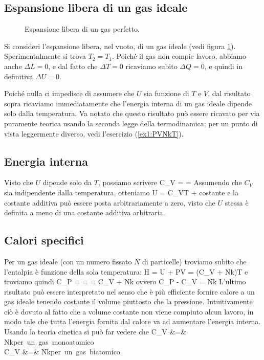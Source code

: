 \subsection{Espansione libera di un gas ideale}
\begin{figure}[!ht]
  \centering
  
  \caption{Espansione libera di un gas perfetto.}
  \label{fig:espansione}
\end{figure}
Si consideri l'espansione libera, nel vuoto, di un gas ideale (vedi figura \ref{fig:espansione}). Sperimentalmente si trova $T_{2} = T_{1}$. Poiché il gas non compie lavoro, abbiamo anche $\Delta L = 0$, e dal fatto che $\Delta T = 0$ ricaviamo subito $\Delta Q = 0$, e quindi in definitiva $\Delta U = 0$.

Poiché nulla ci impedisce di assumere che $U$ sia funzione di $T$ e $V$, dal risultato sopra ricaviamo immediatamente che l'energia interna di un gas ideale dipende solo dalla temperatura. Va notato che questo risultato può essere ricavato per via puramente teorica usando la seconda legge della termodinamica; per un punto di vista leggermente diverso, vedi l'esercizio (\ref{ex1:PVNkT}).

\subsection{Energia interna}
Visto che $U$ dipende solo da $T$, possiamo scrivere
\be
C_{V} =  = 
\ee
Assumendo che $C_{V}$ sia indipendente dalla temperatura, otteniamo 
\be
U = C_{V}T + \textrm{costante}
\ee
e la costante additiva può essere posta arbitrariamente a zero, visto che $U$ stessa è definita a meno di una costante additiva arbitraria.

\subsection{Calori specifici}
Per un gas ideale (con un numero fissato $N$ di particelle) troviamo subito che l'entalpia è funzione della sola temperatura:
\be
H = U + PV = (C_{V} + Nk)T
\ee
e troviamo quindi
\be
C_{P} =  =  = C_{V} + Nk
\ee
ovvero
\be
\label{eq:diff-cs}
C_{P} - C_{V} = Nk
\ee
L'ultimo risultato può essere interpretato nel senso che è più efficiente fornire calore a un gas ideale tenendo costante il volume piuttosto che la pressione. Intuitivamente ciò è dovuto al fatto che a volume costante non viene compiuto alcun lavoro, in modo tale che tutta l'energia fornita dal calore va ad aumentare l'energia interna. Usando la teoria cinetica si può far vedere che
\bea
\label{eq:cv-mono-bi}
C_{V} &=&  Nk\qquad\mbox{per un gas monoatomico}\\
C_{V} &=&  Nk\qquad\mbox{per un gas biatomico}\\
\eea

